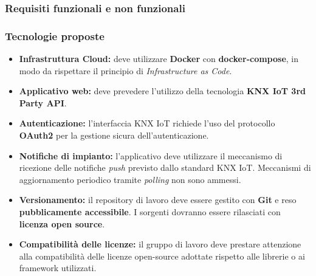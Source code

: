 \documentclass[a4paper,11pt]{article}
\begin{document}
\subsubsection{Requisiti funzionali e non funzionali}

\subsubsection{Tecnologie proposte}
\begin{itemize}
  \item \textbf{Infrastruttura Cloud:} deve utilizzare \textbf{Docker} con \textbf{docker-compose}, in modo da rispettare il principio di \textit{Infrastructure as Code}.
  \item \textbf{Applicativo web:} deve prevedere l’utilizzo della tecnologia \textbf{KNX IoT 3rd Party API}.
  \item \textbf{Autenticazione:} l’interfaccia KNX IoT richiede l’uso del protocollo \textbf{OAuth2} per la gestione sicura dell’autenticazione.
  \item \textbf{Notifiche di impianto:} l’applicativo deve utilizzare il meccanismo di ricezione delle notifiche \textit{push} previsto dallo standard KNX IoT.  
  Meccanismi di aggiornamento periodico tramite \textit{polling} non sono ammessi.
  \item \textbf{Versionamento:} il repository di lavoro deve essere gestito con \textbf{Git} e reso \textbf{pubblicamente accessibile}.  
  I sorgenti dovranno essere rilasciati con \textbf{licenza open source}.
  
  \item \textbf{Compatibilità delle licenze:} il gruppo di lavoro deve prestare attenzione alla compatibilità delle licenze open-source adottate rispetto alle librerie o ai framework utilizzati.
\end{itemize}
\end{document}
